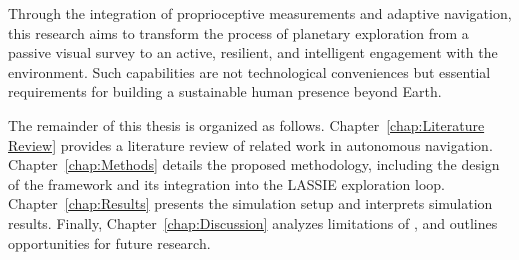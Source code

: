 Through the integration of proprioceptive measurements and adaptive navigation, this research aims to transform the process of planetary exploration from a passive visual survey to an active, resilient, and intelligent engagement with the environment. Such capabilities are not technological conveniences but essential requirements for building a sustainable human presence beyond Earth.

The remainder of this thesis is organized as follows. Chapter~\ref{chap:Literature Review} provides a literature review of related work in autonomous navigation. Chapter~\ref{chap:Methods} details the proposed methodology, including the design of the \algoname{} framework and its integration into the LASSIE exploration loop. Chapter~\ref{chap:Results} presents the simulation setup and interprets simulation results. Finally, Chapter~\ref{chap:Discussion} analyzes limitations of \algoname{}, and outlines opportunities for future research.
